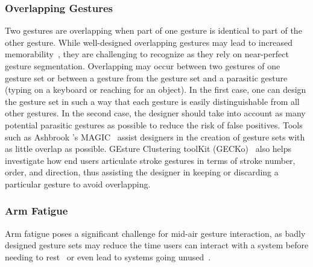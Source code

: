 \subsubsection{Overlapping Gestures} \label{sec:state_of_the_art:overview:challenges:overlapping-gestures}
Two gestures are overlapping when part of one gesture is identical to part of the other gesture. While well-designed overlapping gestures may lead to increased memorability~\cite{Roy:2013}, they are challenging to recognize as they rely on near-perfect gesture segmentation. Overlapping may occur between two gestures of one gesture set or between a gesture from the gesture set and a parasitic gesture (\eg typing on a keyboard or reaching for an object). In the first case, one can design the gesture set in such a way that each gesture is easily distinguishable from all other gestures. In the second case, the designer should take into account as many potential parasitic gestures as possible to reduce the risk of false positives. Tools such as Ashbrook \etal's MAGIC~\cite{Ashbrook:2010} assist designers in the creation of gesture sets with as little overlap as possible. GEsture Clustering toolKit (GECKo)~\cite{Anthony:2013} also helps investigate how end users articulate stroke gestures in terms of stroke number, order, and direction, thus assisting the designer in keeping or discarding a particular gesture to avoid overlapping.





\subsubsection{Arm Fatigue} \label{sec:state_of_the_art:overview:challenges:gorilla-arm}
Arm fatigue poses a significant challenge for mid-air gesture interaction, as badly designed gesture sets may reduce the time users can interact with a system before needing to rest~\cite{Hansberger:2017} or even lead to systems going unused~\cite{Siddhpuria:2017}. 


